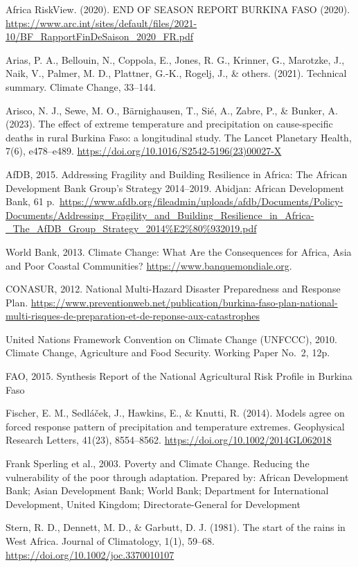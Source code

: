 \documentclass[
]{book}
\begin{document}
Africa RiskView. (2020). END OF SEASON REPORT \textbar{} BURKINA FASO (2020). \url{https://www.arc.int/sites/default/files/2021-10/BF_RapportFinDeSaison_2020_FR.pdf}

Arias, P. A., Bellouin, N., Coppola, E., Jones, R. G., Krinner, G., Marotzke, J., Naik, V., Palmer, M. D., Plattner, G.-K., Rogelj, J., \& others. (2021). Technical summary. Climate Change, 33--144.

Arisco, N. J., Sewe, M. O., Bärnighausen, T., Sié, A., Zabre, P., \& Bunker, A. (2023). The effect of extreme temperature and precipitation on cause-specific deaths in rural Burkina Faso: a longitudinal study. The Lancet Planetary Health, 7(6), e478--e489. \url{https://doi.org/10.1016/S2542-5196(23)00027-X}

AfDB, 2015. Addressing Fragility and Building Resilience in Africa: The African Development Bank Group's Strategy 2014--2019. Abidjan: African Development Bank, 61 p.~\url{https://www.afdb.org/fileadmin/uploads/afdb/Documents/Policy-Documents/Addressing_Fragility_and_Building_Resilience_in_Africa-_The_AfDB_Group_Strategy_2014\%E2\%80\%932019.pdf}

World Bank, 2013. Climate Change: What Are the Consequences for Africa, Asia and Poor Coastal Communities? \url{https://www.banquemondiale.org}.

CONASUR, 2012. National Multi-Hazard Disaster Preparedness and Response Plan. \url{https://www.preventionweb.net/publication/burkina-faso-plan-national-multi-risques-de-preparation-et-de-reponse-aux-catastrophes}

United Nations Framework Convention on Climate Change (UNFCCC), 2010. Climate Change, Agriculture and Food Security. Working Paper No.~2, 12p.

FAO, 2015. Synthesis Report of the National Agricultural Risk Profile in Burkina Faso

Fischer, E. M., Sedláček, J., Hawkins, E., \& Knutti, R. (2014). Models agree on forced response pattern of precipitation and temperature extremes. Geophysical Research Letters, 41(23), 8554--8562. \url{https://doi.org/10.1002/2014GL062018}

Frank Sperling et al., 2003. Poverty and Climate Change. Reducing the vulnerability of the poor through adaptation. Prepared by: African Development Bank; Asian Development Bank; World Bank; Department for International Development, United Kingdom; Directorate-General for Development

Stern, R. D., Dennett, M. D., \& Garbutt, D. J. (1981). The start of the rains in West Africa. Journal of Climatology, 1(1), 59--68. \url{https://doi.org/10.1002/joc.3370010107}
\end{document}

